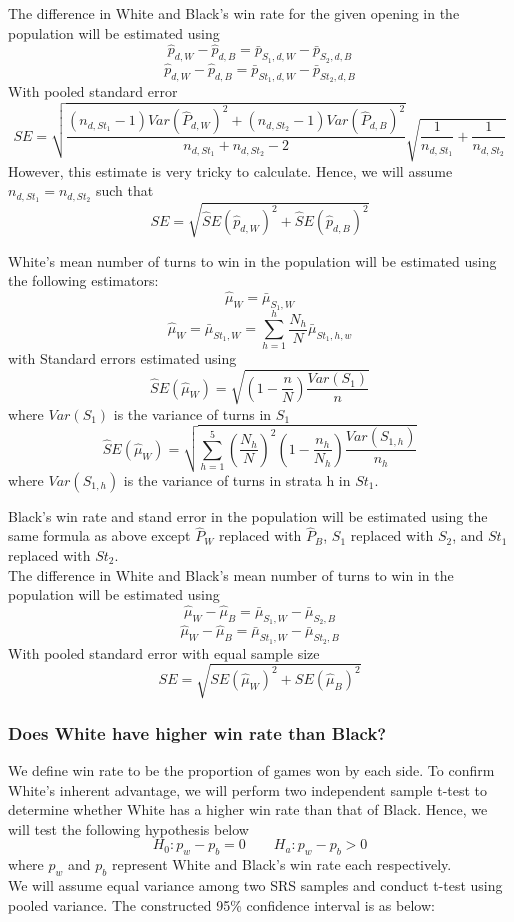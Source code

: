 \documentclass[11pt,]{article}
\begin{document}
The difference in White and Black's win rate for the given opening in
the population will be estimated using
\[\hat p_{d,W} - \hat p_{d,B} = \bar p_{S_1,d,W} - \bar p_{S_2,d,B}\]
\[\hat p_{d,W} - \hat p_{d,B} = \bar p_{St_1,d,W} - \bar p_{St_2,d,B}\]
With pooled standard error
\[SE = \sqrt{\frac{(n_{d,St_1}-1)Var(\hat P_{d,W})^2 + (n_{d,St_2}-1)Var(\hat P_{d,B})^2}{n_{d,St_1} + n_{d,St_2} -2}}\sqrt{\frac{1}{n_{d,St_1}}
+\frac{1}{n_{d,St_2}}}\] However, this estimate is very tricky to
calculate. Hence, we will assume \(n_{d,St_1} = n_{d,St_2}\) such that
\[SE = \sqrt{\hat SE(\hat p_{d, W})^2 +  \hat SE(\hat p_{d, B})^2}\]
\newline

White's mean number of turns to win in the population will be estimated
using the following estimators: \[\hat \mu_W = \bar \mu_{S_1, W}\]
\[\hat \mu_W = \bar \mu_{St_1, W} = \sum_{h=1}^{h}\frac{N_h}{N}\bar \mu_{St_1,h,w}\]
with Standard errors estimated using
\[\hat SE(\hat \mu_{W}) = \sqrt{(1-\frac{n}{N})\frac{Var(S_1)}{n}}\]
where \(Var(S_1)\) is the variance of turns in \(S_1\)
\[\hat SE(\hat \mu_{W}) = \sqrt{\sum_{h=1}^{5}(\frac{N_h}{N})^2(1-\frac{n_h}{N_h})\frac{Var(S_{1,h})}{n_h}}\]
where \(Var(S_{1,h})\) is the variance of turns in strata h in \(St_1\).

Black's win rate and stand error in the population will be estimated
using the same formula as above except \(\hat P_{W}\) replaced with
\(\hat P_{B}\), \(S_1\) replaced with \(S_2\), and \(St_1\) replaced
with \(St_2\).\\
\newline The difference in White and Black's mean number of turns to win
in the population will be estimated using
\[\hat \mu_{W} - \hat \mu_{B} = \bar \mu_{S_1,W} - \bar \mu_{S_2,B}\]
\[\hat \mu_{W} - \hat \mu_{B} = \bar \mu_{St_1,W} - \bar \mu_{St_2,B}\]
With pooled standard error with equal sample size
\[SE = \sqrt{SE(\hat \mu_W)^2 + SE(\hat \mu_B)^2}\]

\hypertarget{does-white-have-higher-win-rate-than-black}{%
\subsubsection{\texorpdfstring{\textbf{Does White have higher win rate
than
Black?}}{Does White have higher win rate than Black?}}\label{does-white-have-higher-win-rate-than-black}}

We define win rate to be the proportion of games won by each side. To
confirm White's inherent advantage, we will perform two independent
sample t-test to determine whether White has a higher win rate than that
of Black. Hence, we will test the following hypothesis below
\[H_0 : p_w - p_b = 0 \quad  \quad H_a : p_w - p_b > 0\] where \(p_w\)
and \(p_b\) represent White and Black's win rate each respectively.\\
\newline We will assume equal variance among two SRS samples and conduct
t-test using pooled variance. The constructed 95\% confidence interval
is as below:
\end{document}
